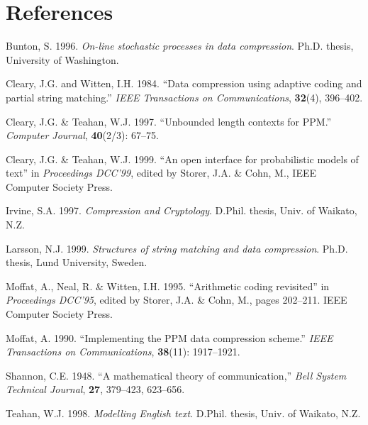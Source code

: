 \documentclass[11pt]{article}
\begin{document}
\section{References}

{\small
\begin{list}{}{\setlength{\parsep}{0.1 cm} \setlength{\rightmargin}{0 cm}
\setlength{\leftmargin}{0 cm}}
\baselineskip 13pt

\item []
Bunton, S. 1996.
{\em On-line stochastic processes in data compression}.
Ph.D. thesis, University of Washington.

\item []
Cleary, J.G. and Witten, I.H. 1984.
``Data compression using adaptive coding and partial string matching.''
{\em IEEE Transactions on Communications}, {\bf 32}(4), 396--402.

\item []
Cleary, J.G. \& Teahan, W.J. 1997.
``Unbounded length contexts for PPM.''
{\em Computer Journal}, {\bf 40}(2/3): 67--75.

\item []
Cleary, J.G. \& Teahan, W.J. 1999.
``An open interface for probabilistic models of text'' in
{\em Proceedings DCC'99}, edited by Storer, J.A. \& Cohn, M.,
IEEE Computer Society Press.

\item []
Irvine, S.A. 1997. {\em Compression and Cryptology}. D.Phil. thesis,
Univ. of Waikato, N.Z.

\item []
Larsson, N.J. 1999.
{\em Structures of string matching and data compression}.
Ph.D. thesis, Lund University, Sweden.

\item []
Moffat, A., Neal, R. \& Witten, I.H. 1995.
``Arithmetic coding revisited'' in {\em Proceedings DCC'95},
edited by Storer, J.A. \& Cohn, M., pages 202--211. IEEE Computer Society
Press.

\item []
Moffat, A. 1990.
``Implementing the PPM data compression scheme.''
{\em IEEE Transactions on Communications}, {\bf 38}(11): 1917--1921.

\item []
Shannon, C.E. 1948. ``A mathematical theory of communication,''
{\em Bell System Technical Journal}, {\bf 27}, 379--423, 623--656.

\item []
Teahan, W.J. 1998. {\em Modelling English text}. D.Phil. thesis,
Univ. of Waikato, N.Z.


\end{list}}
\end{document}
